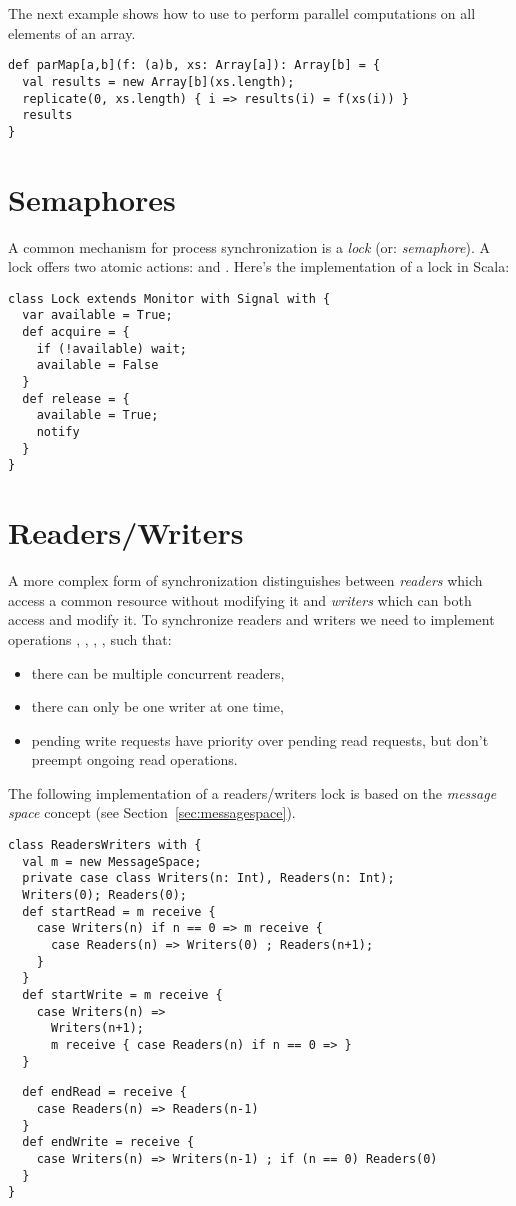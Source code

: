 \documentclass[11pt]{report}
\begin{document}
The next example shows how to use \verb@replicate@ to perform parallel
computations on all elements of an array.

\begin{verbatim}
def parMap[a,b](f: (a)b, xs: Array[a]): Array[b] = {
  val results = new Array[b](xs.length);
  replicate(0, xs.length) { i => results(i) = f(xs(i)) }
  results
}
\end{verbatim}

\section{Semaphores}

A common mechanism for process synchronization is a {\em lock} (or:
{\em semaphore}). A lock offers two atomic actions:  and
. Here's the implementation of a lock in Scala:

\begin{verbatim}
class Lock extends Monitor with Signal with {
  var available = True;
  def acquire = {
    if (!available) wait;
    available = False
  }
  def release = {
    available = True;
    notify
  }
}
\end{verbatim}

\section{Readers/Writers}

A more complex form of synchronization distinguishes between {\em
readers} which access a common resource without modifying it and {\em
writers} which can both access and modify it. To synchronize readers
and writers we need to implement operations , ,
, , such that:
\begin{itemize}
\item there can be multiple concurrent readers,
\item there can only be one writer at one time,
\item pending write requests have priority over pending read requests,
but don't preempt ongoing read operations.
\end{itemize}
The following implementation of a readers/writers lock is based on the
{\em message space} concept (see Section~\ref{sec:messagespace}).

\begin{verbatim}
class ReadersWriters with {
  val m = new MessageSpace;
  private case class Writers(n: Int), Readers(n: Int);
  Writers(0); Readers(0);
  def startRead = m receive {
    case Writers(n) if n == 0 => m receive {
      case Readers(n) => Writers(0) ; Readers(n+1);
    }
  }
  def startWrite = m receive {
    case Writers(n) =>
      Writers(n+1);
      m receive { case Readers(n) if n == 0 => }
  }
\end{verbatim}
\begin{verbatim}
  def endRead = receive {
    case Readers(n) => Readers(n-1)
  }
  def endWrite = receive {
    case Writers(n) => Writers(n-1) ; if (n == 0) Readers(0)
  }
}
\end{verbatim}
\end{document}
